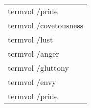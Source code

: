 {\tt
  \begin{tabular}{|l|}
    \hline
    termvol /pride        \\
    termvol /covetousness \\
    termvol /lust         \\
    termvol /anger        \\
    termvol /gluttony     \\
    termvol /envy         \\
    termvol /pride        \\
    \hline
  \end{tabular}
}
